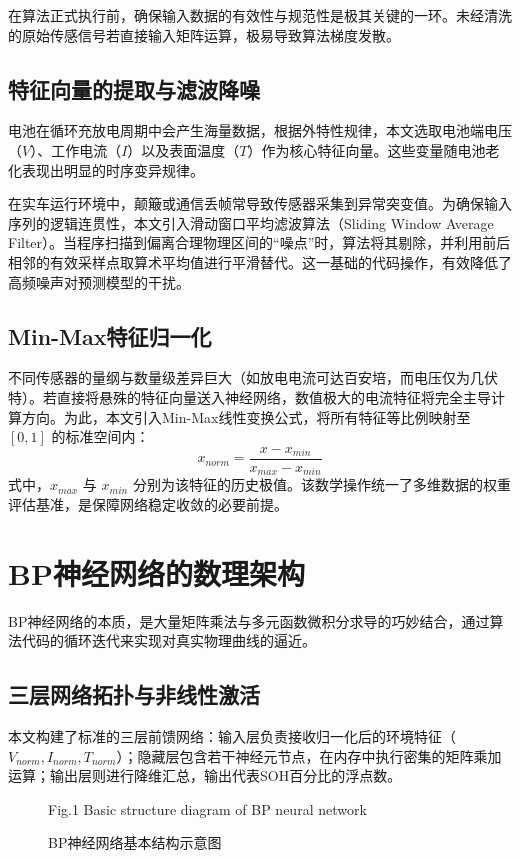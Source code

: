 \documentclass[a4paper,10.5pt]{article}
\begin{document}
在算法正式执行前，确保输入数据的有效性与规范性是极其关键的一环。未经清洗的原始传感信号若直接输入矩阵运算，极易导致算法梯度发散。

\subsection{特征向量的提取与滤波降噪}
电池在循环充放电周期中会产生海量数据，根据外特性规律，本文选取电池端电压（$V$）、工作电流（$I$）以及表面温度（$T$）作为核心特征向量。这些变量随电池老化表现出明显的时序变异规律。

在实车运行环境中，颠簸或通信丢帧常导致传感器采集到异常突变值。为确保输入序列的逻辑连贯性，本文引入滑动窗口平均滤波算法（Sliding Window Average Filter）。当程序扫描到偏离合理物理区间的“噪点”时，算法将其剔除，并利用前后相邻的有效采样点取算术平均值进行平滑替代。这一基础的代码操作，有效降低了高频噪声对预测模型的干扰。

\subsection{Min-Max特征归一化}
不同传感器的量纲与数量级差异巨大（如放电电流可达百安培，而电压仅为几伏特）。若直接将悬殊的特征向量送入神经网络，数值极大的电流特征将完全主导计算方向。为此，本文引入Min-Max线性变换公式，将所有特征等比例映射至 $[0,1]$ 的标准空间内：
\begin{equation}
    x_{norm}=\frac{x-x_{min}}{x_{max}-x_{min}}
\end{equation}
式中，$x_{max}$ 与 $x_{min}$ 分别为该特征的历史极值。该数学操作统一了多维数据的权重评估基准，是保障网络稳定收敛的必要前提。

\section{BP神经网络的数理架构}

BP神经网络的本质，是大量矩阵乘法与多元函数微积分求导的巧妙结合，通过算法代码的循环迭代来实现对真实物理曲线的逼近。

\subsection{三层网络拓扑与非线性激活}
本文构建了标准的三层前馈网络：输入层负责接收归一化后的环境特征（$V_{norm}, I_{norm}, T_{norm}$）；隐藏层包含若干神经元节点，在内存中执行密集的矩阵乘加运算；输出层则进行降维汇总，输出代表SOH百分比的浮点数。

\begin{figure}[htbp]
    \centering
    \caption{BP神经网络基本结构示意图}
    \vspace{0.5ex} 
    \centerline{ Fig.1 Basic structure diagram of BP neural network}
\end{figure}
\end{document}
